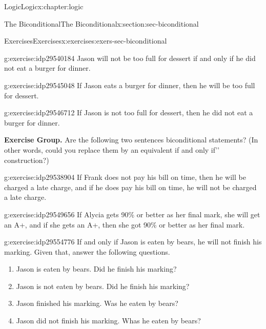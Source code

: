 \documentclass[twoside,10pt,]{book}
\numberwithin{equation}{section}
\begin{document}
\begin{chapterptx}{Logic}{}{Logic}{}{}{x:chapter:logic}
\begin{sectionptx}{The Biconditional}{}{The Biconditional}{}{}{x:section:sec-biconditional}
\begin{exercises-subsection}{Exercises}{}{Exercises}{}{}{x:exercises:exers-sec-biconditional}
\begin{exercisegroup}
\begin{divisionexerciseeg}{28}{}{}{g:exercise:idp29540184}
Jason will not be too full for dessert if and only if he did not eat a burger for dinner.\end{divisionexerciseeg}%
\begin{divisionexerciseeg}{29}{}{}{g:exercise:idp29545048}%
If Jason eats a burger for dinner, then he will be too full for dessert.\end{divisionexerciseeg}%
\begin{divisionexerciseeg}{30}{}{}{g:exercise:idp29546712}%
If Jason is not too full for dessert, then he did not eat a burger for dinner.\end{divisionexerciseeg}%
\end{exercisegroup}
\par\medskip\noindent
\par\medskip\noindent%
\textbf{Exercise Group.}\space\space%
Are the following two sentences biconditional statements?  (In other words, could you replace them by an equivalent \textasciigrave{}\textasciigrave{}if and only if'{}'{} construction?)\begin{exercisegroup}
\begin{divisionexerciseeg}{31}{}{}{g:exercise:idp29538904}%
If Frank does not pay his bill on time, then he will be charged a late charge, and if he does pay his bill on time, he will not be charged a late charge.\end{divisionexerciseeg}%
\begin{divisionexerciseeg}{32}{}{}{g:exercise:idp29549656}%
If Alycia gets 90\% or better as her final mark, she will get an A+, and if she gets an A+, then she got 90\% or better as her final mark.\end{divisionexerciseeg}%
\end{exercisegroup}
\par\medskip\noindent
\begin{divisionexercise}{33}{}{}{g:exercise:idp29554776}%
If and only if Jason is eaten by bears, he will not finish his marking.  Given that, answer the following questions. %
\begin{enumerate}[label=(\alph*)]
\item{}Jason is eaten by bears.  Did he finish his marking?%
\item{}Jason is not eaten by bears.  Did he finish his marking?%
\item{}Jason finished his marking.  Was he eaten by bears?%
\item{}Jason did not finish his marking.  Whas he eaten by bears?%
\end{enumerate}

\end{divisionexercise}
\end{exercises-subsection}
\end{sectionptx}
\end{chapterptx}
\end{document}
